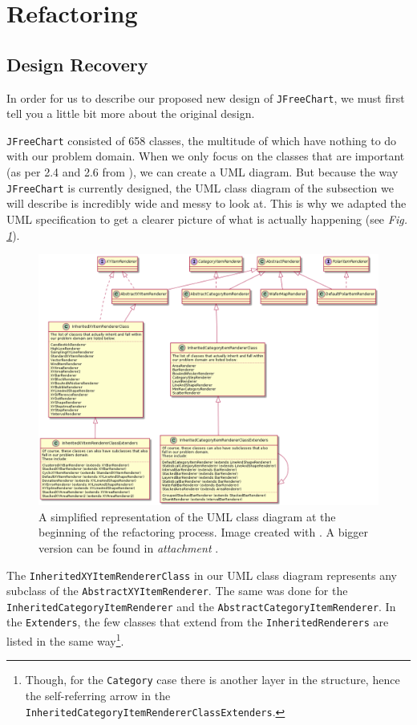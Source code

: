 \documentclass[11pt]{article}
\begin{document}
	
	\section{Refactoring}
	\subsection{Design Recovery}
	In order for us to describe our proposed new design of \texttt{JFreeChart}, we must first tell you a little bit more about the original design.
	
	\texttt{JFreeChart} consisted of 658 classes, the multitude of which have nothing to do with our problem domain. When we only focus on the classes that are important (as per 2.4 and 2.6 from \cite{demeyer2009object}), we can create a UML diagram. But because the way \texttt{JFreeChart} is currently designed, the UML class diagram of the subsection we will describe is incredibly wide and messy to look at. This is why we adapted the UML specification to get a clearer picture of what is actually happening (see \textsl{Fig.\,\ref{fig:UML-start}}).
	
	\begin{figure}[H]
		\centering
		\includegraphics[scale=0.3]{pictures/class-diagram-begin.png}
		\caption{A simplified representation of the UML class diagram at the beginning of the refactoring process. Image created with \cite{plantuml}. A bigger version can be found in \textsl{attachment \pageref{class-diagram-begin}}.}
		\label{fig:UML-start}
	\end{figure}
	
	The \texttt{InheritedXYItemRendererClass} in our UML class diagram represents any subclass of the \texttt{AbstractXYItemRenderer}. The same was done for the \texttt{InheritedCategoryItemRenderer} and the \texttt{AbstractCategoryItemRenderer}. In the \texttt{Extenders}, the few classes that extend from the \texttt{InheritedRenderers} are listed in the same way\footnote{Though, for the \texttt{Category} case there is another layer in the structure, hence the self-referring arrow in the \texttt{InheritedCategoryItemRendererClassExtenders}.}.
	
\end{document}
